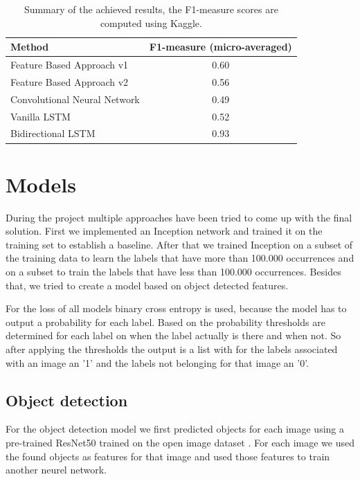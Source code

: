 \documentclass[10pt, a4paper]{article}
\begin{document}
\begin{multicols}{2}
		\begin{table}[t]
			\centering
			\begin{tabular}{l|c}
				\toprule
				\textbf{Method} & \textbf{F1-measure (micro-averaged)} \\
				\midrule
				Feature Based Approach v1 & 0.60   \\
				Feature Based Approach v2 & 0.56 \\
				Convolutional Neural Network & 0.49 \\
				Vanilla LSTM & 0.52 \\
				Bidirectional LSTM & 0.93 \\
				\bottomrule
			\end{tabular}
			\caption{Summary of the achieved results, the F1-measure scores are computed using Kaggle.}
			\label{table:summary_results}
		\end{table}
		
		
		\section{Models}
		During the project multiple approaches have been tried to come up with the final solution. First we implemented an Inception network and trained it on the training set to establish a baseline. After that we trained Inception on a subset of the training data to learn the labels that have more than 100.000 occurrences and on a subset to train the labels that have less than 100.000 occurrences. Besides that, we tried to create a model based on object detected features.
		
		For the loss of all models binary cross entropy is used, because the model has to output a probability for each label. Based on the probability thresholds are determined for each label on when the label actually is there and when not. So after applying the thresholds the output is a list with for the labels associated with an image an '1' and the labels not belonging for that image an '0'.
		
		\subsection{Object detection}
		For the object detection model we first predicted objects for each image using a pre-trained ResNet50 \cite{DBLP:journals/corr/HeZRS15} trained on the open image dataset \cite{openimages}. For each image we used the found objects as features for that image and used those features to train another neurel network. 
		

\end{multicols}
\end{document}

